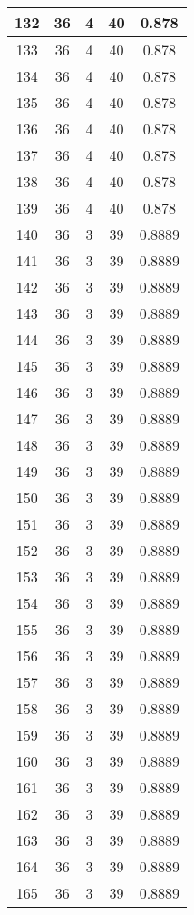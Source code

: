 \documentclass[letterpaper, 12pt]{article}
\begin{document}
\begin{longtable}{|c|c|c|c|c|}
\hline
132 & 36 & 4 & 40 & 0.878 \\
\hline
133 & 36 & 4 & 40 & 0.878 \\
\hline
134 & 36 & 4 & 40 & 0.878 \\
\hline
135 & 36 & 4 & 40 & 0.878 \\
\hline
136 & 36 & 4 & 40 & 0.878 \\
\hline
137 & 36 & 4 & 40 & 0.878 \\
\hline
138 & 36 & 4 & 40 & 0.878 \\
\hline
139 & 36 & 4 & 40 & 0.878 \\
\hline
140 & 36 & 3 & 39 & 0.8889 \\
\hline
141 & 36 & 3 & 39 & 0.8889 \\
\hline
142 & 36 & 3 & 39 & 0.8889 \\
\hline
143 & 36 & 3 & 39 & 0.8889 \\
\hline
144 & 36 & 3 & 39 & 0.8889 \\
\hline
145 & 36 & 3 & 39 & 0.8889 \\
\hline
146 & 36 & 3 & 39 & 0.8889 \\
\hline
147 & 36 & 3 & 39 & 0.8889 \\
\hline
148 & 36 & 3 & 39 & 0.8889 \\
\hline
149 & 36 & 3 & 39 & 0.8889 \\
\hline
150 & 36 & 3 & 39 & 0.8889 \\
\hline
151 & 36 & 3 & 39 & 0.8889 \\
\hline
152 & 36 & 3 & 39 & 0.8889 \\
\hline
153 & 36 & 3 & 39 & 0.8889 \\
\hline
154 & 36 & 3 & 39 & 0.8889 \\
\hline
155 & 36 & 3 & 39 & 0.8889 \\
\hline
156 & 36 & 3 & 39 & 0.8889 \\
\hline
157 & 36 & 3 & 39 & 0.8889 \\
\hline
158 & 36 & 3 & 39 & 0.8889 \\
\hline
159 & 36 & 3 & 39 & 0.8889 \\
\hline
160 & 36 & 3 & 39 & 0.8889 \\
\hline
161 & 36 & 3 & 39 & 0.8889 \\
\hline
162 & 36 & 3 & 39 & 0.8889 \\
\hline
163 & 36 & 3 & 39 & 0.8889 \\
\hline
164 & 36 & 3 & 39 & 0.8889 \\
\hline
165 & 36 & 3 & 39 & 0.8889 \\

\end{longtable}
\end{document}
